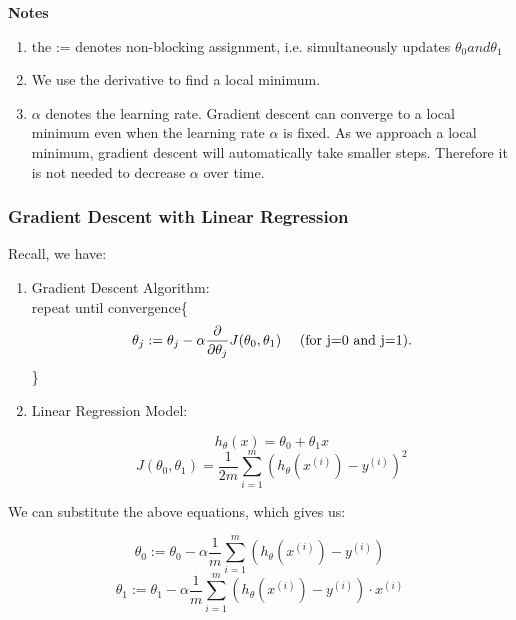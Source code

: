            \textbf{Notes}
               \begin{enumerate}
                   \item the := denotes non-blocking assignment, i.e. simultaneously updates $\theta_0 and \theta_1$ 
                   \item We use the derivative to find a local minimum. 
                   \item $\alpha$ denotes the learning rate. Gradient descent can converge to a local minimum even when the learning rate $\alpha$ is fixed. As we approach a local minimum, gradient descent will automatically take smaller steps. Therefore it is not needed to decrease $\alpha$ over time. 
               \end{enumerate}

       \subsubsection{Gradient Descent with Linear Regression}
     
       Recall, we have:
       \begin{enumerate}
           \item Gradient Descent Algorithm: \\ 

               repeat until convergence\{  
                    \[ \theta_j := \theta_j - \alpha \frac{\partial }{\partial \theta_j} J(\theta_0, \theta_1)\mbox{\hspace{10pt} (for j=0 and j=1)} 
                   .\] \}


           \item Linear Regression Model:
               \begin{center}
                   \[h_\theta (x) = \theta_0 + \theta_1x\]
                   \[J(\theta_0, \theta_1) = \frac{1}{2m} \sum_{i=1}^{m} (h_\theta(x^{(i)}) - y^{(i)} )^2\]             

               \end{center}

       \end{enumerate}
            
                 
                
    We can substitute the above equations, which gives us:
       \begin{center}
           \[\theta_0 := \theta_0 - \alpha \frac{1}{m} \sum_{i=1}^{m} (h_\theta(x^{(i)}) - y^{(i)} )\] 
               \[\theta_1 := \theta_1 - \alpha \frac{1}{m} \sum_{i=1}^{m} (h_\theta(x^{(i)}) - y^{(i)} ) \cdot x^{(i)}\]  

       
       \end{center} 
    

